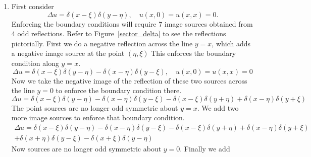 {\begin{Solution}
\begin{enumerate}
\begin{gather*}
      \left( u_{a a} + u_{b b} \right) \left| 2 z \right|^2 
      = 4 \left( x^2 + y^2 \right) \delta(a - \alpha) \delta(b - \beta)
      \\
      u_{a a} + u_{b b} = \delta(a - \alpha) \delta(b - \beta)
      \\
      u = \frac{1}{4 \pi} \ln \left( 
        \frac{ \left((a-\alpha)^2 + (b-\beta)^2 \right) }{ \left((a-\alpha)^2 + (b+\beta)^2 \right) }
      \right)
      \\
      u = \frac{1}{4 \pi} \ln \left( 
        \frac{ \left((x^2 - y^2 - \xi^2 + \eta^2)^2 + (2 x y - 2 \xi \eta)^2 \right) }
        { \left((x^2 - y^2 - \xi^2 + \eta^2)^2 + (2 x y + 2 \xi \eta)^2 \right) }
      \right)
      \\
      \boxed{
        u = \frac{1}{4 \pi} \ln \left( 
          \frac{ \left((x-\xi)^2 + (y-\eta)^2 \right) \left((x+\xi)^2 + (y+\eta)^2 \right) }
          { \left((x+\xi)^2 + (y-\eta)^2 \right) \left((x-\xi)^2 + (y+\eta)^2 \right) }
        \right)
        }
    \end{gather*}
    We obtain the some solution as before.
  \item 
    First consider
    \[
    \Delta u = \delta(x-\xi) \delta(y-\eta), \quad u(x,0) = u(x,x) = 0.
    \]
    Enforcing the boundary conditions will require 7 image sources obtained 
    from 4 odd reflections.  Refer to Figure~\ref{sector_delta} to see the 
    reflections pictorially.
    First we do a negative reflection across the line $y = x$, which adds 
    a negative image source at the point $(\eta,\xi)$ This enforces the 
    boundary condition along $y = x$.
    \[
    \Delta u = \delta(x-\xi) \delta(y-\eta) - \delta(x-\eta) \delta(y-\xi), \quad u(x,0) = u(x,x) = 0
    \]
    Now we take the negative image of the reflection of these two sources across
    the line $y = 0$ to enforce the boundary condition there.
    \[
    \Delta u = \delta(x-\xi) \delta(y-\eta) - \delta(x-\eta) \delta(y-\xi) - \delta(x-\xi) \delta(y+\eta) + \delta(x-\eta) \delta(y+\xi)
    \]
    The point sources are no longer odd symmetric about $y = x$.  We add two 
    more image sources to enforce that boundary condition.
    \begin{multline*}
      \Delta u = \delta(x-\xi) \delta(y-\eta) - \delta(x-\eta) \delta(y-\xi) - \delta(x-\xi) \delta(y+\eta) + \delta(x-\eta) \delta(y+\xi)
      \\
      + \delta(x+\eta) \delta(y-\xi) - \delta(x+\xi) \delta(y-\eta)
    \end{multline*}
    Now sources are no longer odd symmetric about $y = 0$.  Finally we add 

\end{enumerate}
\end{Solution}}
